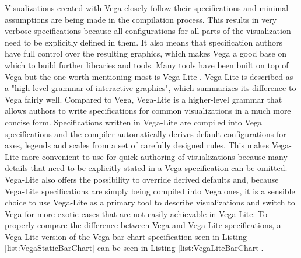 Visualizations created with Vega closely follow their specifications and minimal assumptions are being made in the compilation process. This results in very verbose specifications because all configurations for all parts of the visualization need to be explicitly defined in them. It also means that specification authors have full control over the resulting graphics, which makes Vega a good base on which to build further libraries and tools. Many tools \parencite{Voyager,Lyra,CompassQL} have been built on top of Vega but the one worth mentioning most is Vega-Lite \parencite{VegaLite}. Vega-Lite is described as a "high-level grammar of interactive graphics", which summarizes its difference to Vega fairly well. Compared to Vega, Vega-Lite is a higher-level grammar that allows authors to write specifications for common visualizations in a much more concise form. Specifications written in Vega-Lite are compiled into Vega specifications and the compiler automatically derives default configurations for axes, legends and scales from a set of carefully designed rules. This makes Vega-Lite more convenient to use for quick authoring of visualizations because many details that need to be explicitly stated in a Vega specification can be omitted. Vega-Lite also offers the possibility to override derived defaults and, because Vega-Lite specifications are simply being compiled into Vega ones, it is a sensible choice to use Vega-Lite as a primary tool to describe visualizations and switch to Vega for more exotic cases that are not easily achievable in Vega-Lite. To properly compare the difference between Vega and Vega-Lite specifications, a Vega-Lite version of the Vega bar chart specification seen in Listing \ref{list:VegaStaticBarChart} can be seen in Listing \ref{list:VegaLiteBarChart}.

\begin{samepage}
 is a Vega-Lite specification of the Vega bar chart specification seen in Listing \ref{list:VegaStaticBarChart} combined with Listing \ref{list:VegaBarChart}. 
  },
]{listings/vega-lite-bar-chart.json}
\end{samepage}

